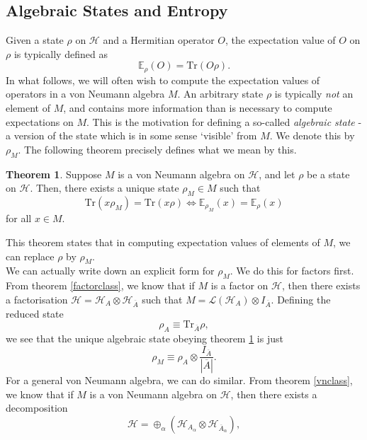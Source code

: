 \documentclass[12pt,a4paper]{report}
\numberwithin{equation}{section}
\newcommand{\ol}[1]{\overline{#1}}
\newcommand{\tr}{\text{Tr}}
\theoremstyle{definition}
\theoremstyle{theorem}
\newtheorem{theorem}{Theorem}[section]
\theoremstyle{theorem}
\theoremstyle{example}
\theoremstyle{definition}
\begin{document}
\subsection{Algebraic States and Entropy}
Given a state $\rho$ on $\mathcal{H}$ and a Hermitian operator $O$, the expectation value of $O$ on $\rho$ is typically defined as
\begin{equation}
	\mathbb{E}_{\rho}(O)=\tr(O\rho).
\end{equation}
In what follows, we will often wish to compute the expectation values of operators in a von Neumann algebra $M$. An arbitrary state $\rho$ is typically \textit{not} an element of $M$, and contains more information than is necessary to compute expectations on $M$. This is the motivation for defining a so-called \textit{algebraic state} - a version of the state which is in some sense `visible' from $M$. We denote this by $\rho_{M}$. The following theorem precisely defines what we mean by this.
\begin{theorem}\label{algst}
	Suppose $M$ is a von Neumann algebra on $\mathcal{H}$, and let $\rho$ be a state on $\mathcal{H}$. Then, there exists a unique state $\rho_{M}\in M$ such that
	\begin{equation}
		\tr(x\rho_{M})=\tr(x\rho)\iff \mathbb{E}_{\rho_{M}}(x)=\mathbb{E}_{\rho}(x)
	\end{equation}
	for all $x\in M$.
\end{theorem}
This theorem states that in computing expectation values of elements of $M$, we can replace $\rho$ by $\rho_{M}$.\\
We can actually write down an explicit form for $\rho_{M}$. We do this for factors first. From theorem \ref{factorclass}, we know that if $M$ is a factor on $\mathcal{H}$, then there exists a factorisation $\mathcal{H}=\mathcal{H}_{A}\otimes\mathcal{H}_{\ol{A}}$ such that $M=\mathcal{L}(\mathcal{H}_{A})\otimes I_{\ol{A}}$. Defining the reduced state
\begin{equation}
	\rho_{A}\equiv\tr_{\ol{A}}\rho,
\end{equation} 
we see that the unique algebraic state obeying theorem \ref{algst} is just
\begin{equation}\label{factalg}
	\rho_{M}\equiv\rho_{A}\otimes\frac{I_{\ol{A}}}{|\ol{A}|}.
\end{equation}
For a general von Neumann algebra, we can do similar. From theorem \ref{vnclass}, we know that if $M$ is a von Neumann algebra on $\mathcal{H}$, then there exists a decomposition
\begin{equation}\label{decomp1}
	\mathcal{H}=\oplus_{\alpha}(\mathcal{H}_{A_{\alpha}}\otimes\mathcal{H}_{\ol{A}_{\alpha}}),
\end{equation}
\end{document}
